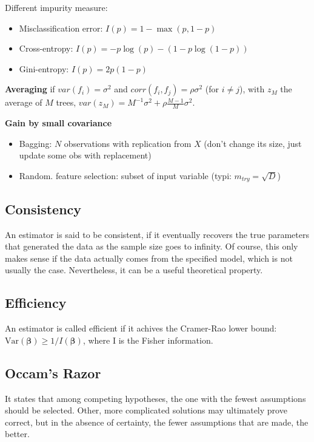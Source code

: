 \documentclass[10pt,a4paper,landscape]{article}
\newcommand{\Var}{\mathrm{Var}}
\newcommand{\bbeta}{\boldsymbol\beta}
\begin{document}
\begin{multicols*}{4}
Different impurity measure:
\begin{itemize}
	\item Misclassification error: $I(p) = 1-\max(p, 1-p)$
	\item Cross-entropy: $I(p)= -p\log(p) - (1-p\log(1-p))$
	\item Gini-entropy: $I(p) = 2p(1-p)$
\end{itemize}

\textbf{Averaging} if $var(f_i) = \sigma^2$ and $corr(f_i, f_j) = \rho\sigma^2$ (for $i\neq j$), with $z_M$ the average of $M$ trees, $var(z_M) = M^{-1}\sigma^2 + \rho\frac{M-1}{M}\sigma^2$.

\textbf{Gain by small covariance}
\begin{itemize}
	\item Bagging: $N$ observations with replication from $X$ (don't change its size, just update some obs with replacement)
	\item Random. feature selection: subset of input variable (typi: $m_{try} = \sqrt{D}$)
\end{itemize}

\clearpage

\subsection{Consistency}
An estimator is said to be consistent, if it eventually recovers the true parameters that generated the data as the sample size goes to infinity. Of course, this only makes sense if the data actually comes from the specified model, which is not usually the case. Nevertheless, it can be a useful theoretical property.

\subsection{Efficiency}
An estimator is called efficient if it achives the Cramer-Rao lower bound:
$\Var{(\bbeta)} \geq 1/I(\bbeta)$, where I is the Fisher information.

\subsection{Occam's Razor}
It states that among competing hypotheses, the one with the fewest assumptions should be selected. Other, more complicated solutions may ultimately prove correct, but in the absence of certainty, the fewer assumptions that are made, the better.


\end{multicols*}
\end{document}
